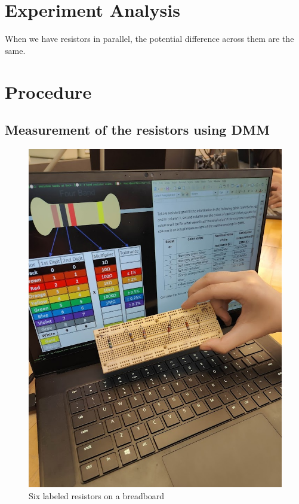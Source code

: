 \documentclass[titlepage]{article}
\begin{document}
	\section{Experiment Analysis}
    When we have resistors in parallel, the potential difference across them are the same. 
    



	\section{Procedure}
        \subsection{Measurement of the resistors using DMM}

        \begin{figure}[hbt!]
                \centering
                \caption{Six labeled resistors on a breadboard}
                \includegraphics[scale=0.2]{procedure/unknownresistors}
            \end{figure} 
\end{document}
